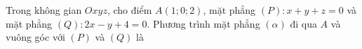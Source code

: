 \begin{ex}
Trong không gian $Oxyz$, cho điểm $A(1;0;2)$, mặt phẳng $(P)\colon x+y+z=0$ và mặt phẳng $(Q)\colon 2x-y+4=0$. Phương trình mặt phẳng $(\alpha)$ đi qua $A$ và vuông góc với $(P)$ và $(Q)$ là
\end{ex}
